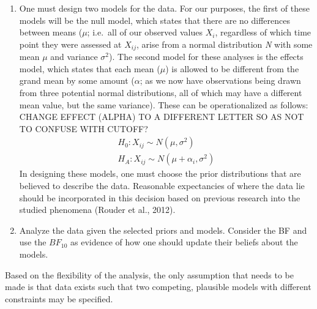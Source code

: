 \documentclass[english,man]{apa6}
\theoremstyle{definition}
\theoremstyle{definition}
\theoremstyle{definition}
\theoremstyle{remark}
\begin{document}
\begin{enumerate}
\def\labelenumi{\arabic{enumi})}
\item
  One must design two models for the data. For our purposes, the first
  of these models will be the null model, which states that there are no
  differences between means (\(\mu\); i.e.~all of our observed values
  \(X_{i}\), regardless of which time point they were assessed at
  \(X_{ij}\), arise from a normal distribution \emph{N} with some mean
  \(\mu\) and variance \(\sigma^2\)). The second model for these
  analyses is the effects model, which states that each mean (\(\mu\))
  is allowed to be different from the grand mean by some amount
  (\(\alpha\); as we now have observations being drawn from three
  potential normal distributions, all of which may have a different mean
  value, but the same variance). These can be operationalized as
  follows: CHANGE EFFECT (ALPHA) TO A DIFFERENT LETTER SO AS NOT TO
  CONFUSE WITH CUTOFF? \[
  \begin{aligned}
    H_0: X_{ij} \sim N(\mu, \sigma^2) \\
    H_A: X_{ij} \sim N(\mu + \alpha_i, \sigma^2)
  \end{aligned}
  \] In designing these models, one must choose the prior distributions
  that are believed to describe the data. Reasonable expectancies of
  where the data lie should be incorporated in this decision based on
  previous research into the studied phenomena (Rouder et al., 2012).
\item
  Analyze the data given the selected priors and models. Consider the BF
  and use the \(BF_{10}\) as evidence of how one should update their
  beliefs about the models.
\end{enumerate}

Based on the flexibility of the analysis, the only assumption that needs
to be made is that data exists such that two competing, plausible models
with different constraints may be specified.
\end{document}
